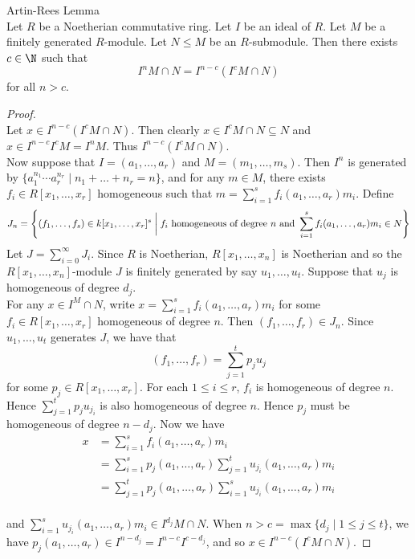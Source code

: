 \documentclass[a4paper]{article}
\begin{document}
\begin{thm}{Artin-Rees Lemma}{}\\
Let $R$ be a Noetherian commutative ring. Let $I$ be an ideal of $R$. Let $M$ be a finitely generated $R$-module. Let $N\leq M$ be an $R$-submodule. Then there exists $c\in\N$ such that $$I^nM\cap N=I^{n-c}(I^cM\cap N)$$ for all $n>c$. 
\begin{proof}\\
Let $x\in I^{n-c}(I^cM\cap N)$. Then clearly $x\in I^cM\cap N\subseteq N$ and $x\in I^{n-c}I^cM=I^nM$. Thus $I^{n-c}(I^cM\cap N)$. \\

Now suppose that $I=(a_1,\dots,a_r)$ and $M=(m_1,\dots,m_s)$. Then $I^n$ is generated by $\{a_1^{n_1}\cdots a_r^{n_r}\;|\;n_1+\dots+n_r=n\}$, and for any $m\in M$, there exists $f_i\in R[x_1,\dots,x_r]$ homogeneous such that $m=\sum_{i=1}^sf_i(a_1,\dots,a_r)m_i$. Define $$J_n=\left\{(f_1,\dots,f_s)\in k[x_1,\dots,x_r]^s\;\bigg{|}\;f_i\text{ homogeneous of degree }n\text{ and }\sum_{i=1}^sf_i(a_1,\dots,a_r)m_i\in N\right\}$$ Let $J=\sum_{i=0}^\infty J_i$. Since $R$ is Noetherian, $R[x_1,\dots,x_n]$ is Noetherian and so the $R[x_1,\dots,x_n]$-module $J$ is finitely generated by say $u_1,\dots,u_t$. Suppose that $u_j$ is homogeneous of degree $d_j$. \\

For any $x\in I^M\cap N$, write $x=\sum_{i=1}^sf_i(a_1,\dots,a_r)m_i$ for some $f_i\in R[x_1,\dots,x_r]$ homogeneous of degree $n$. Then $(f_1,\dots,f_r)\in J_n$. Since $u_1,\dots,u_t$ generates $J$, we have that $$(f_1,\dots,f_r)=\sum_{j=1}^tp_ju_j$$ for some $p_j\in R[x_1,\dots,x_r]$. For each $1\leq i\leq r$, $f_i$ is homogeneous of degree $n$. Hence $\sum_{j=1}^tp_ju_{j_i}$ is also homogeneous of degree $n$. Hence $p_j$ must be homogeneous of degree $n-d_j$. Now we have 
\begin{align*}
x&=\sum_{i=1}^sf_i(a_1,\dots,a_r)m_i\\
&=\sum_{i=1}^sp_j(a_1,\dots,a_r)\sum_{j=1}^tu_{j_i}(a_1,\dots,a_r)m_i\\
&=\sum_{j=1}^tp_j(a_1,\dots,a_r)\sum_{i=1}^su_{j_i}(a_1,\dots,a_r)m_i
\end{align*}\\
and $\sum_{i=1}^su_{j_i}(a_1,\dots,a_r)m_i\in I^{d_j}M\cap N$. When $n>c=\max\{d_j\;|\;1\leq j\leq t\}$, we have $p_j(a_1,\dots,a_r)\in I^{n-d_j}=I^{n-c}I^{c-d_j}$, and so $x\in I^{n-c}(I^cM\cap N)$. 
\end{proof}
\end{thm}
\end{document}

